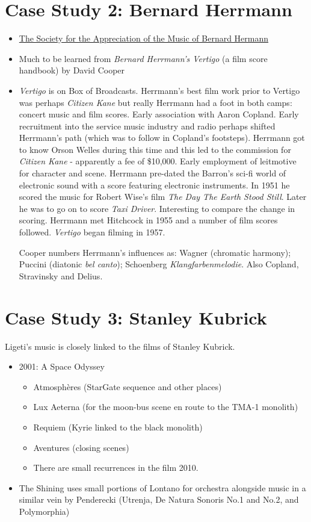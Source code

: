 \section{Case Study 2: Bernard Herrmann}
\begin{itemize}
\item \href{http://www.bernardherrmann.org/}
{The Society for the Appreciation of the Music of Bernard Hermann}
\item Much to be learned from \textit{Bernard Herrmann's Vertigo} (a film score handbook) by David Cooper \citep{cooper2001bernard}
\item \textit{Vertigo} is on Box of Broadcasts. 
Herrmann's best film work prior to Vertigo was perhaps \textit{Citizen Kane} but really Herrmann had a foot in both camps: concert music and film scores.  Early association with Aaron Copland. Early recruitment into the service music industry and radio perhaps shifted Herrmann's path (which was to follow in Copland's footsteps). Herrmann got to know Orson Welles during this time and this led to the commission for \textit{Citizen Kane} - apparently a fee of \$10,000. Early employment of leitmotive for character and scene. Herrmann pre-dated the Barron's sci-fi world of electronic sound with a score featuring electronic instruments. In 1951 he scored the music for Robert Wise's film \textit{The Day The Earth Stood Still}. Later he was to go on to score \textit{Taxi Driver}. Interesting to compare the change in scoring. Herrmann met Hitchcock in 1955 and a number of film scores followed. \textit{Vertigo} began filming in 1957.

Cooper \citeyearpar{cooper2001bernard} numbers Herrmann's influences as: Wagner (chromatic harmony); Puccini (diatonic \textit{bel canto}); Schoenberg \textit{Klangfarbenmelodie}. Also Copland, Stravinsky and Delius. 
\end{itemize}




\section{Case Study 3: Stanley Kubrick}
Ligeti's music is closely linked to the films of Stanley Kubrick. 
\begin{itemize}
\item 2001: A Space Odyssey
\begin{itemize}
\item Atmosphères (StarGate sequence and other places) 
\item Lux Aeterna (for the moon-bus scene en route to the TMA-1 monolith)
\item Requiem (Kyrie linked to the black monolith)
\item Aventures (closing scenes)
\item There are small recurrences in the film 2010.
\end{itemize}
\item The Shining uses small portions of Lontano for orchestra alongside music in a similar vein by Penderecki (Utrenja, De Natura Sonoris No.1 and No.2, and Polymorphia)
\end{itemize}



